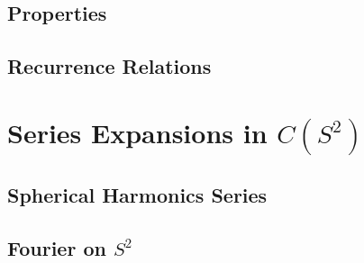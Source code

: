 \subsection{Properties}

\subsection{Recurrence Relations}

\section{Series Expansions in $C(S^2)$}

\subsection{Spherical Harmonics Series}

\subsection{Fourier on $S^2$}
